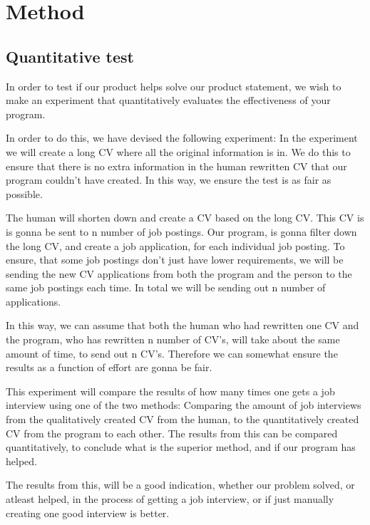 \section{Method}\label{sec:method}
\subsection{Quantitative test}
In order to test if our product helps solve our product statement, we wish
to make an experiment that quantitatively evaluates the effectiveness of your
program. 

In order to do this, we have devised the following experiment:
In the experiment we will create a long CV where all the original information
is in. We do this to ensure that there is no extra information in the human 
rewritten CV that our program couldn't have created. In this way, we ensure
the test is as fair as possible. 

The human will shorten down and create a CV based on the long CV. This CV is
is gonna be sent to n number of job postings.
Our program, is gonna filter down the long CV, and create a job application,
for each individual job posting. 
To ensure, that some job postings don't just have lower requirements, we will be
sending the new CV applications from both the program and the person to the same 
job postings each time. In total we will be sending out n number of applications.

In this way, we can assume that both the human who had rewritten one
CV and the program, who has rewritten n number of CV's,
will take about the same amount of time, to send out n CV's.
Therefore we can somewhat ensure the results as a function of effort are gonna
be fair.

This experiment will compare the results of how many times one gets a job
interview using one of the two methods: Comparing the amount of 
job interviews from the qualitatively created CV from
the human, to the quantitatively created CV from the program to
each other. The results from this can be compared quantitatively, to conclude
what is the superior method, and if our program has helped.

The results from this, will be a good indication, whether our problem solved, or
atleast helped, in the process of getting a job interview, or if just manually
creating one good interview is better.
